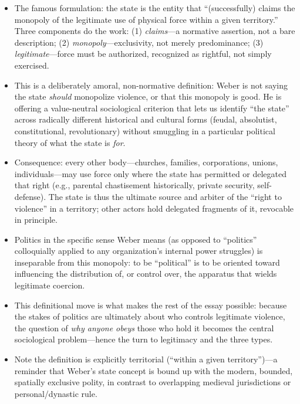 \documentclass[12pt]{article}
\begin{document}
\begin{itemize}[leftmargin=*, itemsep=4pt]
    \item The famous formulation: the state is the entity that ``(successfully) claims the monopoly of the legitimate use of physical force within a given territory.'' Three components do the work: (1) \emph{claims}---a normative assertion, not a bare description; (2) \emph{monopoly}---exclusivity, not merely predominance; (3) \emph{legitimate}---force must be authorized, recognized as rightful, not simply exercised.
    \item This is a deliberately amoral, non-normative definition: Weber is not saying the state \emph{should} monopolize violence, or that this monopoly is good. He is offering a value-neutral sociological criterion that lets us identify ``the state'' across radically different historical and cultural forms (feudal, absolutist, constitutional, revolutionary) without smuggling in a particular political theory of what the state is \emph{for}.
    \item Consequence: every other body---churches, families, corporations, unions, individuals---may use force only where the state has permitted or delegated that right (e.g., parental chastisement historically, private security, self-defense). The state is thus the ultimate source and arbiter of the ``right to violence'' in a territory; other actors hold delegated fragments of it, revocable in principle.
    \item Politics in the specific sense Weber means (as opposed to ``politics'' colloquially applied to any organization's internal power struggles) is inseparable from this monopoly: to be ``political'' is to be oriented toward influencing the distribution of, or control over, the apparatus that wields legitimate coercion.
    \item This definitional move is what makes the rest of the essay possible: because the stakes of politics are ultimately about who controls legitimate violence, the question of \emph{why anyone obeys} those who hold it becomes the central sociological problem---hence the turn to legitimacy and the three types.
    \item Note the definition is explicitly territorial (``within a given territory'')---a reminder that Weber's state concept is bound up with the modern, bounded, spatially exclusive polity, in contrast to overlapping medieval jurisdictions or personal/dynastic rule.
\end{itemize}
\end{document}

